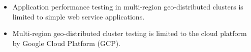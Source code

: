 \begin{itemize}
	\item Application performance testing in multi-region geo-distributed clusters is limited to simple web service applications.
    \item Multi-region geo-distributed cluster testing is limited to the cloud platform by Google Cloud Platform (GCP).
\end{itemize}








